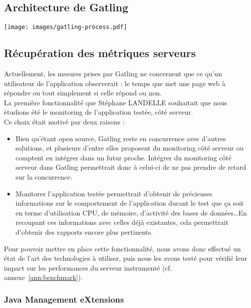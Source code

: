 \subsection{Architecture de Gatling}

\begin{center}
	\texttt{[image: images/gatling-process.pdf]}
\end{center}

\subsection{Récupération des métriques serveurs}

Actuellement, les mesures prises par Gatling ne concernent que ce qu'un utilisateur de l'application observerait : le temps que met une page web à répondre ou tout simplement si celle répond ou non.\\

La première fonctionnalité que Stéphane LANDELLE souhaitait que nous étudions été le monitoring de l'application testée, c\^oté serveur.\\

Ce choix était motivé par deux raisons :

\begin{itemize}
	\item Bien qu'étant open source, Gatling reste en concurrence avec d'autres solutions, et plusieurs d'entre elles proposent du monitoring c\^oté serveur ou comptent en intégrer dans un futur proche. Intégrer du monitoring c\^oté serveur  dans Gatling permettrait donc à celui-ci de ne pas prendre de retard sur la concurrence.
	\item Monitorer l'application testée permettrait d'obtenir de précieuses informations sur le comportement de l'application durant le test que ça soit en terme d'utilisation CPU, de mémoire, d'activité des bases de données\ldots En recoupant ces informations avec celles déjà existantes, cela permettrait d'obtenir des rapports encore plus pertinents.\\
\end{itemize}

Pour pouvoir mettre en place cette fonctionnalité, nous avons donc effectué un état de l'art des technologies à utiliser, puis nous les avons testé pour vérifié leur impact sur les performances du serveur instrumenté (cf. annexe~\ref{ann:benchmark}).\\

\subsubsection{Java Management eXtensions}

